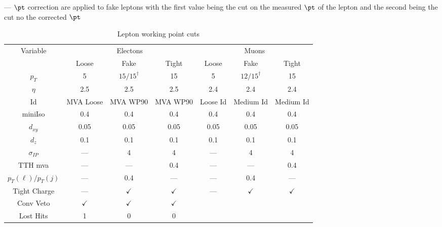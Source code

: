 \begin{table}
  \centering
  \caption{Lepton working point cuts}\label{tab:lepton_selection}
  \textdagger{} --- $\pt$ correction are applied to fake leptons with the first value being the cut on the measured $\pt$ of the lepton and the second being the cut no the corrected $\pt$
  \begin{tabular}{ c c c c c c c }
    \hline
    \multirow{2}{*}{Variable} & \multicolumn{3}{c}{Electons}                       & \multicolumn{3}{c}{Muons}        \\
                              & Loose                        & Fake     & Tight    & Loose    & Fake      & Tight     \\
    \hline
    $p_{T}$                   & 5                            & $15/15^{\dagger}$ & 15       & 5        & $12/15^{\dagger}$  & 15        \\
    $\eta$                       & 2.5                          & 2.5      & 2.5      & 2.4      & 2.4       & 2.4       \\
    Id                        & MVA Loose                    & MVA WP90 & MVA WP90 & Loose Id & Medium Id & Medium Id \\
    miniIso                   & 0.4                          & 0.4      & 0.4      & 0.4      & 0.4       & 0.4       \\
    $d_{xy}$                  & 0.05                         & 0.05     & 0.05     & 0.05     & 0.05      & 0.05      \\
    $d_{z}$                   & 0.1                          & 0.1      & 0.1      & 0.1      & 0.1       & 0.1       \\
    $\sigma_{IP}$                  & ---                            & 4        & 4        & ---        & 4         & 4         \\
    TTH mva                   & ---                            & ---        & 0.4      & ---        & ---         & 0.4       \\
    $p_{T}(\ell)/p_{T}(j)$       & ---                            & 0.4      & ---        & ---        & 0.4       & ---         \\
    Tight Charge              & ---                            & $\checkmark$      & $\checkmark$      & ---        & $\checkmark$       & $\checkmark$       \\
    Conv Veto                 & $\checkmark$                          & $\checkmark$      & $\checkmark$      &                                  \\
    Lost Hits                 & 1                            & 0        & 0        &                                  \\
    \hline
  \end{tabular}
\end{table}

